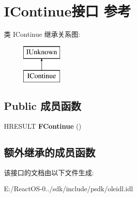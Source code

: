 \hypertarget{interface_i_continue}{}\section{I\+Continue接口 参考}
\label{interface_i_continue}
类 I\+Continue 继承关系图\+:\begin{figure}[H]
\begin{center}
\leavevmode
\includegraphics[height=2.000000cm]{interface_i_continue}
\end{center}
\end{figure}
\subsection*{Public 成员函数}
\begin{DoxyCompactItemize}
\item 
\mbox{\label{interface_i_continue_a404f5878611ccec2bc69fd4341c4e3a9}} 
H\+R\+E\+S\+U\+LT {\bfseries F\+Continue} ()
\end{DoxyCompactItemize}
\subsection*{额外继承的成员函数}


该接口的文档由以下文件生成\+:\begin{DoxyCompactItemize}
\item 
E\+:/\+React\+O\+S-\/0../sdk/include/psdk/oleidl.\+idl\end{DoxyCompactItemize}

